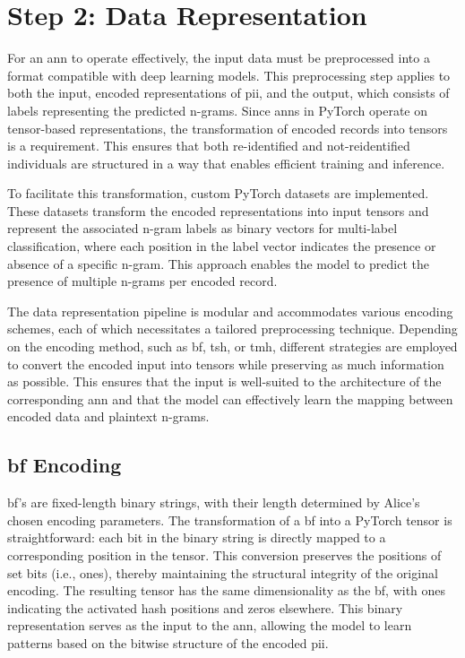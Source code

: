 \section{Step 2: Data Representation} \label{sec:representation}

For an \ac{ann} to operate effectively, the input data must be preprocessed into a format compatible with deep learning models.
This preprocessing step applies to both the input, encoded representations of \ac{pii}, and the output, which consists of labels representing the predicted n-grams.
Since \ac{ann}s in PyTorch operate on tensor-based representations, the transformation of encoded records into tensors is a requirement.
This ensures that both re-identified and not-reidentified individuals are structured in a way that enables efficient training and inference.

To facilitate this transformation, custom PyTorch datasets are implemented.
These datasets transform the encoded representations into input tensors and represent the associated n-gram labels as binary vectors for multi-label classification, where each position in the label vector indicates the presence or absence of a specific n-gram.
This approach enables the model to predict the presence of multiple n-grams per encoded record.

The data representation pipeline is modular and accommodates various encoding schemes, each of which necessitates a tailored preprocessing technique.
Depending on the encoding method, such as \ac{bf}, \ac{tsh}, or \ac{tmh}, different strategies are employed to convert the encoded input into tensors while preserving as much information as possible.
This ensures that the input is well-suited to the architecture of the corresponding \ac{ann} and that the model can effectively learn the mapping between encoded data and plaintext n-grams.

\subsection{\ac{bf} Encoding}

\ac{bf}'s are fixed-length binary strings, with their length determined by Alice’s chosen encoding parameters.
The transformation of a \ac{bf} into a PyTorch tensor is straightforward: each bit in the binary string is directly mapped to a corresponding position in the tensor.
This conversion preserves the positions of set bits (i.e., ones), thereby maintaining the structural integrity of the original encoding.
The resulting tensor has the same dimensionality as the \ac{bf}, with ones indicating the activated hash positions and zeros elsewhere.
This binary representation serves as the input to the \ac{ann}, allowing the model to learn patterns based on the bitwise structure of the encoded \ac{pii}.

